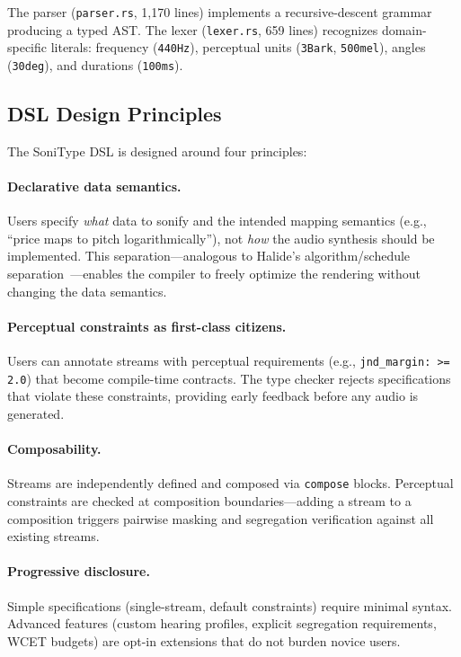 \documentclass[sigchi, nonacm]{acmart}
\begin{document}
The parser (\texttt{parser.rs}, 1,170 lines) implements a recursive-descent grammar producing a typed AST. The lexer (\texttt{lexer.rs}, 659 lines) recognizes domain-specific literals: frequency (\texttt{440Hz}), perceptual units (\texttt{3Bark}, \texttt{500mel}), angles (\texttt{30deg}), and durations (\texttt{100ms}).

\subsection{DSL Design Principles}

The SoniType DSL is designed around four principles:

\paragraph{Declarative data semantics.} Users specify \emph{what} data to sonify and the intended mapping semantics (e.g., ``price maps to pitch logarithmically''), not \emph{how} the audio synthesis should be implemented. This separation---analogous to Halide's algorithm/schedule separation~\cite{ragan2013halide}---enables the compiler to freely optimize the rendering without changing the data semantics.

\paragraph{Perceptual constraints as first-class citizens.} Users can annotate streams with perceptual requirements (e.g., \texttt{jnd\_margin: >= 2.0}) that become compile-time contracts. The type checker rejects specifications that violate these constraints, providing early feedback before any audio is generated.

\paragraph{Composability.} Streams are independently defined and composed via \texttt{compose} blocks. Perceptual constraints are checked at composition boundaries---adding a stream to a composition triggers pairwise masking and segregation verification against all existing streams.

\paragraph{Progressive disclosure.} Simple specifications (single-stream, default constraints) require minimal syntax. Advanced features (custom hearing profiles, explicit segregation requirements, WCET budgets) are opt-in extensions that do not burden novice users.
\end{document}
